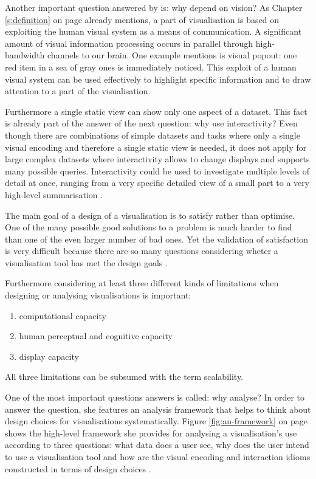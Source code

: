 
Another important question answered by \citeauthor{Munzner2014} is: why depend on vision? As Chapter \ref{s:definition} on page \pageref{s:definition} already mentions, a part of visualisation is based on exploiting the human visual system as a means of communication. A significant amount of visual information processing occurs in parallel through high-bandwidth channels to our brain. One example \citeauthor{Munzner2014} mentions is visual popout: one red item in a sea of gray ones is immediately noticed. This exploit of a human visual system can be used effectively to highlight specific information and to draw attention to a part of the visualisation.

Furthermore a single static view can show only one aspect of a dataset. This fact is already part of the answer of the next question: why use interactivity? Even though there are combinations of simple datasets and tasks where only a single visual encoding and therefore a single static view is needed, it does not apply for large complex datasets where interactivity allows to change displays and supports many possible queries. Interactivity could be used to investigate multiple levels of detail at once, ranging from a very specific detailed view of a small part to a very high-level summarisation .

The main goal of a design of a visualisation is to satisfy rather than optimise. One of the many possible good solutions to a problem is much harder to find than one of the even larger number of bad ones. Yet the validation of satisfaction is very difficult because there are so many questions considering wheter a visualisation tool has met the design goals .

Furthermore considering at least three different kinds of limitations when designing or analysing visualisations is important:
\begin{enumerate}
\item computational capacity
\item human perceptual and cognitive capacity
\item display capacity
\end{enumerate}

All three limitations can be subsumed with the term scalability.

One of the most important questions \citeauthor{Munzner2014} answers is called: why analyse? In order to answer the question, she features an analysis framework that helps to think about design choices for visualisations systematically. Figure \ref{fig:an-framework} on page \pageref{fig:an-framework} shows the high-level framework she provides for analysing a visualisation's use according to three questions: what data does a user see, why does the user intend to use a visualisation tool and how are the visual encoding and interaction idioms constructed in terms of design choices .

